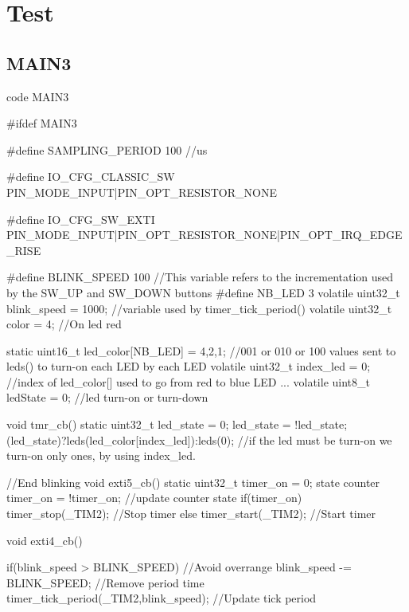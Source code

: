 \section{Test}



\newpage
\subsection{MAIN3}

\begin{Cpp}{code MAIN3} 

#ifdef MAIN3

#define SAMPLING_PERIOD     100     //us                            



#define IO_CFG_CLASSIC_SW           PIN_MODE_INPUT|PIN_OPT_RESISTOR_NONE  

#define IO_CFG_SW_EXTI      PIN_MODE_INPUT|PIN_OPT_RESISTOR_NONE|PIN_OPT_IRQ_EDGE_RISE

#define BLINK_SPEED    100      //This variable refers to the incrementation used by the SW_UP and SW_DOWN buttons
#define NB_LED 3
volatile uint32_t blink_speed = 1000;  //variable used by timer_tick_period()
volatile uint32_t color = 4;  //On led red

static uint16_t led_color[NB_LED] = {4,2,1};  //001 or 010 or 100 values sent to leds() to turn-on each LED by each LED
volatile uint32_t index_led = 0; //index of led_color[] used to go from red to blue LED ...
volatile uint8_t ledState = 0; //led turn-on or turn-down


void tmr_cb()
{
    static uint32_t led_state = 0;
    led_state = !led_state;
	(led_state)?leds(led_color[index_led]):leds(0); //if the led must be turn-on we turn-on only ones, by using index_led.
}

//End blinking
void exti5_cb()
{
    static uint32_t timer_on = 0;  state counter
    timer_on = !timer_on;   //update counter state
    if(timer_on)
    {
        timer_stop(_TIM2);    //Stop timer
    }
    else
    {
        timer_start(_TIM2);   //Start timer
    }
}


void exti4_cb()
{
	if(blink_speed > BLINK_SPEED) //Avoid overrange
	{
		blink_speed -= BLINK_SPEED; //Remove period time
	}
	timer_tick_period(_TIM2,blink_speed); //Update tick period

}
\end{Cpp}
